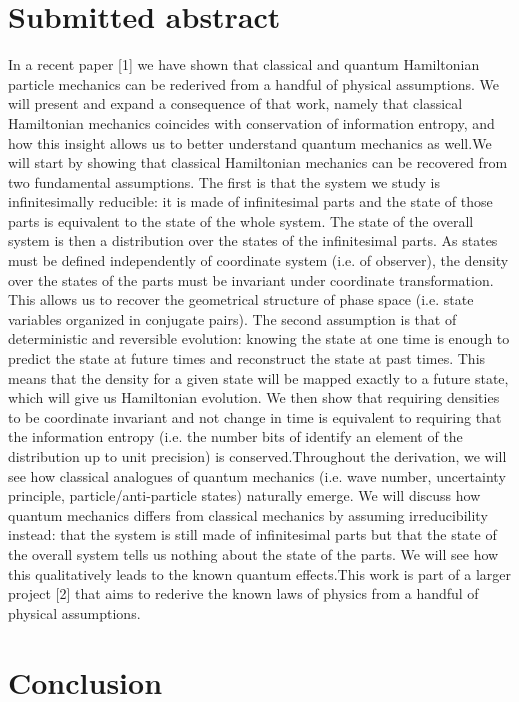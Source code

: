 \documentclass{ws-ijqi}
\begin{document}
\section{Submitted abstract}
In a recent paper [1] we have shown that classical and quantum Hamiltonian particle mechanics can  be  rederived  from  a  handful  of  physical  assumptions.  We  will  present  and  expand  a consequence   of   that   work,   namely   that   classical   Hamiltonian   mechanics   coincides   with conservation of information entropy, and how this insight allows us to better understand quantum mechanics as well.We  will  start  by  showing  that  classical  Hamiltonian  mechanics  can  be  recovered  from  two fundamental assumptions. The first is that the system we study is infinitesimally reducible: it is made  of  infinitesimal  parts  and  the  state  of  those  parts  is  equivalent  to  the  state  of  the  whole system. The state of the overall system is then a distribution over the states of the infinitesimal parts. As states must be defined independently of coordinate system (i.e. of observer), the density over the states of the parts must be invariant under coordinate transformation. This allows us to recover  the  geometrical  structure  of  phase  space  (i.e.  state  variables  organized  in  conjugate pairs). The second assumption is that of deterministic and reversible evolution: knowing the state at one time is enough to predict the state at future times and reconstruct the state at past times. This means that the density for a given state will be mapped exactly to a future state, which will give us Hamiltonian evolution. We then show that requiring densities to be coordinate invariant and  not  change  in  time  is  equivalent  to  requiring  that  the  information  entropy  (i.e.  the  number bits of identify an element of the distribution up to unit precision) is conserved.Throughout the derivation, we will see how classical analogues of quantum mechanics (i.e. wave number, uncertainty principle, particle/anti-particle states) naturally emerge. We will discuss how quantum mechanics differs from classical mechanics by assuming irreducibility instead: that the system is still made of infinitesimal parts but that the state of the overall system tells us nothing about  the  state  of  the  parts.  We  will  see  how  this  qualitatively  leads  to  the  known  quantum effects.This work is part of a larger project [2] that aims to rederive the known laws of physics from a handful of physical assumptions.

\section{Conclusion}
\end{document}
